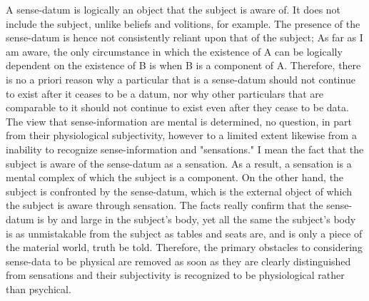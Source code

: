 \documentclass[a4paper,12pt]{book}[2004/02/16]
\theoremstyle{ilemma}
\theoremstyle{itheorem}
\theoremstyle{iother}
\theoremstyle{icorollary}
\theoremstyle{numcorollary}
\theoremstyle{idefinition}
\begin{document}
A sense-datum is logically an object that the subject is aware of. It does not include the subject, unlike beliefs and volitions, for example. The presence of the sense-datum is
hence not consistently reliant upon that of the subject; As far as I am aware, the only circumstance in which the existence of A can be logically dependent on the existence of B is when B is a component of A. Therefore, there is no a priori reason why a particular that is a sense-datum should not continue to exist after it ceases to be a datum, nor why other particulars that are comparable to it should not continue to exist even after they cease to be data. The view that sense-information are mental is determined, no question, in
part from their physiological subjectivity, however to a limited extent likewise from a
inability to recognize sense-information and "sensations." I mean the fact that the subject is aware of the sense-datum as a sensation. As a result, a sensation is a mental complex of which the subject is a component. On the other hand, the subject is confronted by the sense-datum, which is the external object of which the subject is aware through sensation. The facts really confirm that the
sense-datum is by and large in the subject's body, yet all the same the subject's
body is as unmistakable from the subject as tables and seats are, and is
only a piece of the material world, truth be told. Therefore, the primary obstacles to considering sense-data to be physical are removed as soon as they are clearly distinguished from sensations and their subjectivity is recognized to be physiological rather than psychical.
\end{document}
